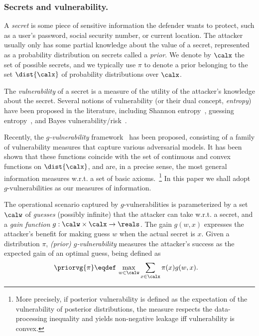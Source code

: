   
\subsubsection{Secrets and vulnerability.}
A \emph{secret} is some piece of sensitive information the 
defender wants to protect, such as a user's password, social 
security number, or current location. 
The attacker usually only has some partial knowledge 
about the value of a secret, represented as a probability
distribution on secrets called a \emph{prior}.
We denote by $\calx$ the set of possible secrets,
and we typically use $\pi$ to denote a prior belonging to 
the set $\dist{\calx}$ of probability distributions over 
$\calx$. 

The \emph{vulnerability} of a secret is a measure of the utility 
of the attacker's knowledge about the secret. 
Several notions of vulnerability (or their dual concept, \emph{entropy}) 
have been proposed in the literature, including Shannon entropy~\cite{Shannon:48:Bell},
guessing entropy~\cite{Massey:94:IT}, and Bayes vulnerability/risk~\cite{Smith:09:FOSSACS,Chatzikokolakis:08:JCS}.

Recently, the \emph{$g$-vulnerability} framework~\cite{alvim}
has been proposed, consisting of a family of vulnerability 
measures that capture various adversarial models.
It has been shown that these functions coincide with the set of 
continuous and convex functions on $\dist{\calx}$, and are, 
in a precise sense, the most general information measures w.r.t. a 
set of basic axioms.~\footnote{
More precisely, if posterior vulnerability 
is defined as the expectation of the vulnerability of posterior
distributions, 
the measure respects the data-processing inequality 
and yields non-negative leakage iff
vulnerability is convex.}
In this paper we shall adopt $g$-vulnerabilities as our measures
of information.

The operational scenario captured by $g$-vulnerabilities 
is parameterized by a set $\calw$ of
\emph{guesses} (possibly infinite) that the attacker can take
w.r.t. a secret, and a \emph{gain function}
$g : \calw \times \calx \rightarrow \reals$. 
The gain $g(w,x)$ expresses the attacker's benefit for making
guess $w$ when the actual secret is $x$.
Given a distribution $\pi$, \emph{(prior) $g$-vulnerability} measures
the attacker's success as the expected gain of an optimal guess, being
defined as
\begin{align*}
\priorvg{\pi} 
\eqdef &\, \max_{w \in \calw} \sum_{x \in \calx} \pi(x) g(w,x).
\end{align*}

